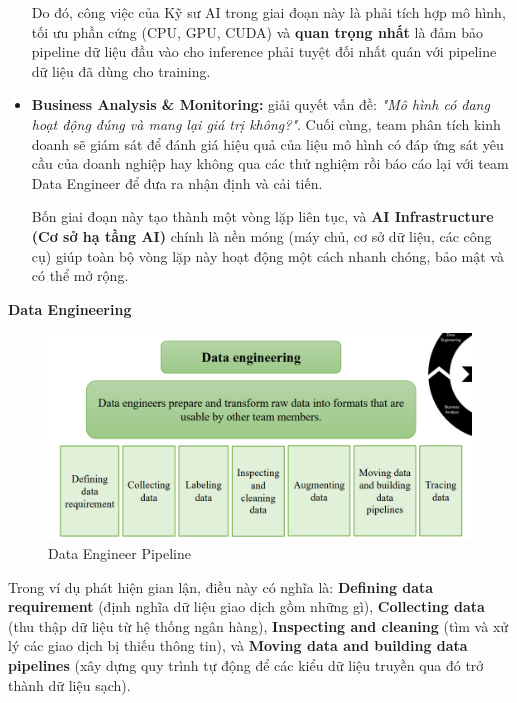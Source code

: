 \documentclass[11pt]{article}
\begin{document}
\begin{itemize}
	Do đó, công việc của Kỹ sư AI trong giai đoạn này là phải tích hợp mô hình, tối ưu phần cứng (CPU, GPU, CUDA) và \textbf{quan trọng nhất} là đảm bảo pipeline dữ liệu đầu vào cho inference phải tuyệt đối nhất quán với pipeline dữ liệu đã dùng cho training.
	

	\item \textbf{Business Analysis \& Monitoring:} giải quyết vấn đề: \textit{"Mô hình có đang hoạt động đúng và mang lại giá trị không?"}.
	Cuối cùng, team phân tích kinh doanh sẽ giám sát để đánh giá hiệu quả của liệu mô hình có đáp ứng sát yêu cầu của doanh nghiệp hay không qua các thử nghiệm rồi báo cáo lại với team Data Engineer để đưa ra nhận định và cải tiến.

	Bốn giai đoạn này tạo thành một vòng lặp liên tục, và \textbf{AI Infrastructure (Cơ sở hạ tầng AI)} chính là nền móng (máy chủ, cơ sở dữ liệu, các công cụ) giúp toàn bộ vòng lặp này hoạt động một cách nhanh chóng, bảo mật và có thể mở rộng.
\end{itemize}

\noindent \textbf{Data Engineering}
\begin{figure}[H]
    \centering
    \includegraphics[width=0.8\linewidth]{images/dt_engineer.png}
    \caption{Data Engineer Pipeline}
\end{figure}
Trong ví dụ phát hiện gian lận, điều này có nghĩa là: \textbf{Defining data requirement} (định nghĩa dữ liệu giao dịch gồm những gì), \textbf{Collecting data} (thu thập dữ liệu từ hệ thống ngân hàng), \textbf{Inspecting and cleaning} (tìm và xử lý các giao dịch bị thiếu thông tin), và \textbf{Moving data and building data pipelines} (xây dựng quy trình tự động để các kiểu dữ liệu truyền qua đó trở thành dữ liệu sạch). \\
\end{document}
